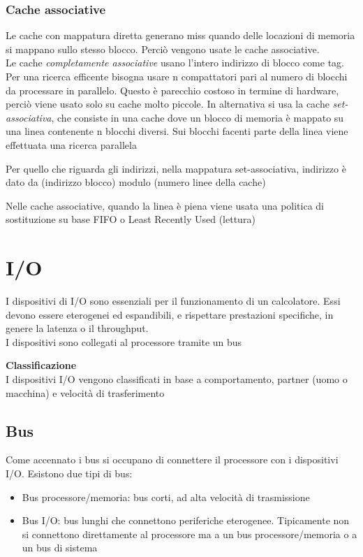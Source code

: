 \documentclass[12pt, a4paper]{article}
\begin{document}
\subsubsection{Cache associative}
Le cache con mappatura diretta generano miss quando delle locazioni di memoria si mappano sullo stesso blocco. Perciò
vengono usate le cache associative.\\Le cache \textit{completamente associative } usano l'intero indirizzo di blocco come tag. 
Per una ricerca efficente bisogna usare n compattatori pari al numero di blocchi da processare in parallelo. Questo è
parecchio costoso in termine di hardware, perciò viene usato solo su cache molto piccole. In alternativa si usa la 
cache \textit{set-associativa}, che consiste in una cache dove un blocco di memoria è mappato su una linea contenente n
blocchi diversi. Sui blocchi facenti parte della linea viene effettuata una ricerca parallela

Per quello che riguarda gli indirizzi, nella mappatura set-associativa, indirizzo è dato da (indirizzo blocco) modulo 
(numero linee della cache)

Nelle cache associative, quando la linea è piena viene usata una politica di sostituzione su base FIFO o Least Recently 
Used (lettura)

\newpage
\section{I/O}
I dispositivi di I/O sono essenziali per il funzionamento di un calcolatore. Essi devono essere eterogenei ed 
espandibili, e rispettare prestazioni specifiche, in genere la latenza o il throughput.\\ I dispositivi sono collegati
al processore tramite un bus

\textbf{Classificazione}\\ I dispositivi I/O vengono classificati in base a comportamento, partner (uomo o macchina)
e velocità di trasferimento

\subsection{Bus}
Come accennato i bus si occupano di connettere il processore con i dispositivi I/O. Esistono due tipi di bus:
\begin{itemize}
  \item Bus processore/memoria: bus corti, ad alta velocità di trasmissione
  \item Bus I/O: bus lunghi che connettono periferiche eterogenee. Tipicamente non si connettono direttamente al 
  processore ma a un bus processore/memoria o a un bus di sistema
\end{itemize}
\end{document}
